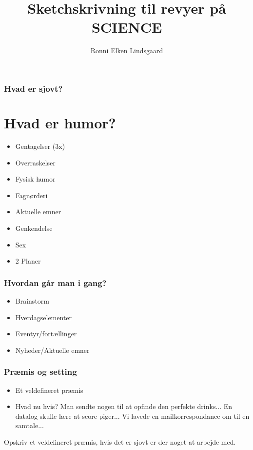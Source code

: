 \documentclass{beamer}
\title{Sketchskrivning til revyer på SCIENCE}
\author{Ronni Elken Lindsgaard}
\begin{document}
\begin{frame}
  \maketitle
\end{frame}

\begin{frame}
  \frametitle{Hvad er sjovt?}
  \section{Hvad er humor?}
  \begin{itemize}
   \pause
    \item Gentagelser (3x)
    \pause
    \item Overraskelser 
    \pause
    \item Fysisk humor
    \pause
    \item Fagnørderi 
    \pause
    \item Aktuelle emner
    \pause
    \item Genkendelse
    \pause
    \item Sex
    \pause
    \item 2 Planer
  \end{itemize}
\end{frame}

\begin{frame}
  \frametitle{Hvordan går man i gang?}
  \begin{itemize}
    \pause
    \item Brainstorm
    \pause
    \item Hverdagselementer 
    \pause
    \item Eventyr/fortællinger
    \pause
    \item Nyheder/Aktuelle emner
  \end{itemize}
\end{frame}

\begin{frame}
  \frametitle{Præmis og setting}
    \begin{itemize}
      \item Et veldefineret præmis  
      \item Hvad nu hvis?
        Man sendte nogen til at opfinde den perfekte drinks...
        En datalog skulle lære at score piger...
        Vi lavede en mailkorrespondance om til en samtale...
    \end{itemize} 
    Opskriv et veldefineret præmis, hvis det er sjovt er der noget at
    arbejde med.
\end{frame}
\end{document}

